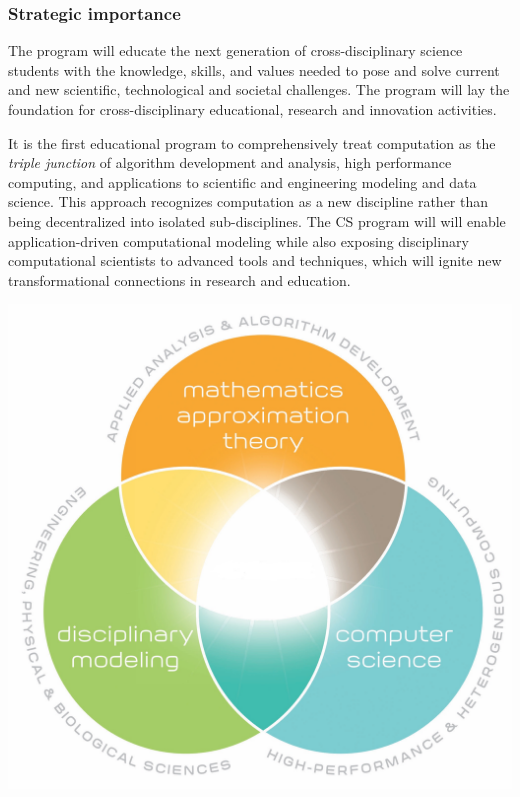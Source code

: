 \documentclass{beamer}
\begin{document}
\begin{frame}
\frametitle{Strategic importance}

The program will educate the next generation of cross-disciplinary
science students with the knowledge, skills, and values needed to pose
and solve current and new scientific, technological and societal
challenges. The program will lay the foundation for cross-disciplinary
educational, research and innovation activities.

It is the first educational program to
comprehensively treat computation as the \emph{triple junction} of
algorithm development and analysis, high performance computing, and
applications to scientific and engineering modeling and data
science. This approach recognizes computation as a new discipline
rather than being decentralized into isolated sub-disciplines. The CS program
will  will enable application-driven computational modeling
while also exposing disciplinary computational scientists to
advanced tools and techniques, which will ignite new
transformational connections in research and education.




\vspace{6mm}

\centerline{\includegraphics[width=0.6\linewidth]{figslides/cs.jpg}}

\vspace{6mm}
\end{frame}
\end{document}
